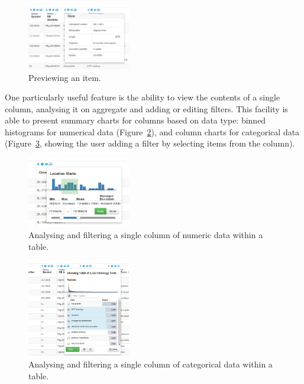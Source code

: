 \documentclass[10pt,a4paper,twocolumn]{article}
\begin{document}
\begin{figure}[htb]
\centering
\includegraphics[width=0.4\textwidth]{preview-gene.png}
\caption{\label{fig:preview} Previewing an item.}
\end{figure}

One particularly useful feature is the ability to view the contents of a
single column, analysing it on aggregate and adding or editing filters. This
facility is able to present summary charts for columns based on data type:
binned histograms for numerical data (Figure~\ref{fig:column-summary}), and
column charts for categorical data (Figure~\ref{fig:cat-column-summary},
showing the user adding a filter by selecting items from the column).

\begin{figure}[t]
\centering
\includegraphics[width=0.4\textwidth]{im-tables-column-summary.png}
\caption{
    \label{fig:column-summary}
    Analysing and filtering a single column of numeric data within a table.
}
\end{figure}

\begin{figure}[t]
\centering
\includegraphics[width=0.4\textwidth]{category-column-summary.png}
\caption{
    \label{fig:cat-column-summary}
    Analysing and filtering a single column of categorical data within a table.
}
\end{figure}
\end{document}

